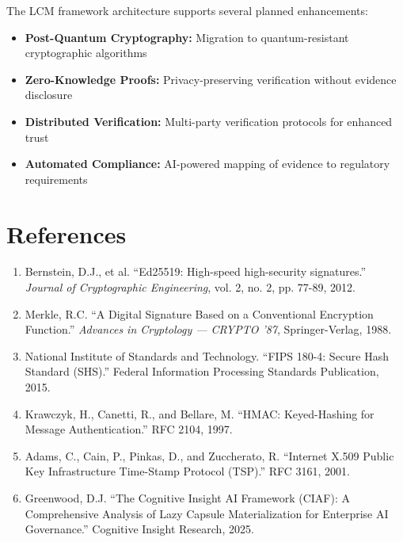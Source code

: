 \documentclass[12pt,a4paper]{article}
\begin{document}
The LCM framework architecture supports several planned enhancements:

\begin{itemize}
\item \textbf{Post-Quantum Cryptography:} Migration to quantum-resistant cryptographic algorithms
\item \textbf{Zero-Knowledge Proofs:} Privacy-preserving verification without evidence disclosure
\item \textbf{Distributed Verification:} Multi-party verification protocols for enhanced trust
\item \textbf{Automated Compliance:} AI-powered mapping of evidence to regulatory requirements
\end{itemize}

\newpage

\section*{References}

\begin{enumerate}
\item Bernstein, D.J., et al. ``Ed25519: High-speed high-security signatures.'' \textit{Journal of Cryptographic Engineering}, vol. 2, no. 2, pp. 77-89, 2012.

\item Merkle, R.C. ``A Digital Signature Based on a Conventional Encryption Function.'' \textit{Advances in Cryptology — CRYPTO '87}, Springer-Verlag, 1988.

\item National Institute of Standards and Technology. ``FIPS 180-4: Secure Hash Standard (SHS).'' Federal Information Processing Standards Publication, 2015.

\item Krawczyk, H., Canetti, R., and Bellare, M. ``HMAC: Keyed-Hashing for Message Authentication.'' RFC 2104, 1997.

\item Adams, C., Cain, P., Pinkas, D., and Zuccherato, R. ``Internet X.509 Public Key Infrastructure Time-Stamp Protocol (TSP).'' RFC 3161, 2001.

\item Greenwood, D.J. ``The Cognitive Insight AI Framework (CIAF): A Comprehensive Analysis of Lazy Capsule Materialization for Enterprise AI Governance.'' Cognitive Insight Research, 2025.
\end{enumerate}
\end{document}
